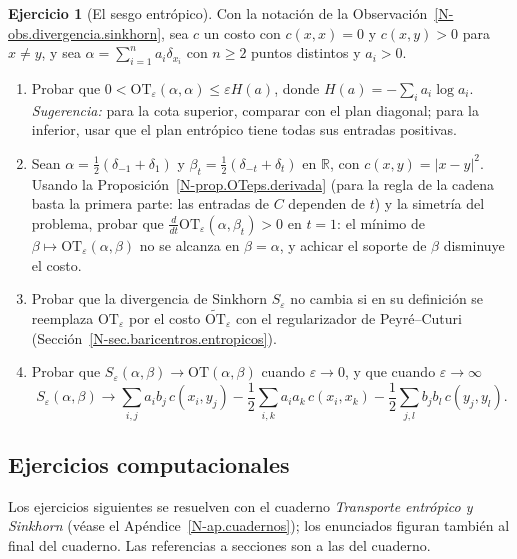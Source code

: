 \documentclass[11pt,a4paper]{amsart}
\newcounter{chapter}
\newcommand{\ve}{\varepsilon}
\newcommand{\R}{{\mathbb R}}
\theoremstyle{remark}
\theoremstyle{definition}
\newtheorem{ejercicio}{Ejercicio}[chapter]
\numberwithin{subsection}{section}
\numberwithin{equation}{section}
\begin{document}
\begin{ejercicio}[El sesgo entrópico]\label{ejer.sinkhorn.sesgo}
Con la notación de la Observación~\ref{N-obs.divergencia.sinkhorn}, sea $c$
un costo con $c(x,x)=0$ y $c(x,y)>0$ para $x\ne y$, y sea
$\alpha=\sum_{i=1}^na_i\delta_{x_i}$ con $n\ge2$ puntos distintos y $a_i>0$.
\begin{enumerate}[label=(\alph*)]
\item Probar que $0<\mathrm{OT}_\ve(\alpha,\alpha)\le\ve H(a)$, donde
$H(a)=-\sum_ia_i\log a_i$. \emph{Sugerencia:} para la cota superior,
comparar con el plan diagonal; para la inferior, usar que el plan entrópico
tiene todas sus entradas positivas.
\item Sean $\alpha=\frac12(\delta_{-1}+\delta_1)$ y
$\beta_t=\frac12(\delta_{-t}+\delta_t)$ en $\R$, con $c(x,y)=|x-y|^2$.
Usando la Proposición~\ref{N-prop.OTeps.derivada} (para la regla de la
cadena basta la primera parte: las entradas de $C$ dependen de $t$) y la
simetría del problema, probar que
$\frac{d}{dt}\mathrm{OT}_\ve(\alpha,\beta_t)>0$ en $t=1$: el mínimo de
$\beta\mapsto\mathrm{OT}_\ve(\alpha,\beta)$ no se alcanza en $\beta=\alpha$,
y achicar el soporte de $\beta$ disminuye el costo.
\item Probar que la divergencia de Sinkhorn $S_\ve$ no cambia si en su
definición se reemplaza $\mathrm{OT}_\ve$ por el costo
$\widetilde{\mathrm{OT}}_\ve$ con el regularizador de Peyré--Cuturi
(Sección~\ref{N-sec.baricentros.entropicos}).
\item Probar que $S_\ve(\alpha,\beta)\to\mathrm{OT}(\alpha,\beta)$ cuando
$\ve\to0$, y que cuando $\ve\to\infty$
\[
S_\ve(\alpha,\beta)\to\sum_{i,j}a_ib_j\,c(x_i,y_j)
-\frac12\sum_{i,k}a_ia_k\,c(x_i,x_k)-\frac12\sum_{j,l}b_jb_l\,c(y_j,y_l).
\]
\end{enumerate}
\end{ejercicio}

\subsection*{Ejercicios computacionales}

Los ejercicios siguientes se resuelven con el cuaderno \emph{Transporte
entrópico y Sinkhorn} (véase el Apéndice~\ref{N-ap.cuadernos}); los enunciados
figuran también al final del cuaderno. Las referencias a secciones son a las
del cuaderno.
\end{document}
